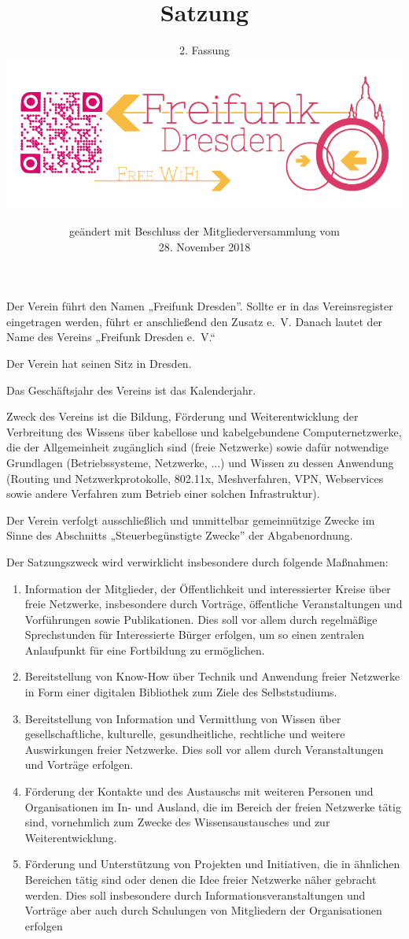 \documentclass[parskip]{scrartcl}
\title{Satzung}
\subtitle{2. Fassung\\\href{https://www.freifunk-dresden.de}{\includegraphics{assets/Logo_Freifunk_Dresden}}}
\date{geändert mit Beschluss der Mitgliederversammlung vom\\28. November 2018}
\begin{document}
\maketitle
\tableofcontents\newpage

\begin{contract} %

Der Verein führt den Namen „Freifunk Dresden”. Sollte er in das Vereinsregister eingetragen werden, führt er anschließend den Zusatz e.~V. Danach lautet der Name des Vereins „Freifunk Dresden e.~V.“

Der Verein hat seinen Sitz in Dresden.

Das Geschäftsjahr des Vereins ist das Kalenderjahr.


Zweck des Vereins ist die Bildung, Förderung und Weiterentwicklung der Verbreitung des Wissens über kabellose und kabelgebundene Computernetzwerke, die der Allgemeinheit zugänglich sind (freie Netzwerke) sowie dafür notwendige Grundlagen (Betriebssysteme, Netzwerke, ...) und Wissen zu dessen Anwendung (Routing und Netzwerkprotokolle, 802.11x, Meshverfahren, VPN, Webservices sowie andere Verfahren zum Betrieb einer solchen Infrastruktur).

Der Verein verfolgt ausschließlich und unmittelbar gemeinnützige Zwecke im Sinne des Abschnitts „Steuerbegünstigte Zwecke” der Abgabenordnung.

Der Satzungszweck wird verwirklicht insbesondere durch folgende Maßnahmen:

\begin{enumerate}
\item Information der Mitglieder, der Öffentlichkeit und interessierter Kreise über freie Netzwerke, insbesondere durch Vorträge, öffentliche Veranstaltungen und Vorführungen sowie Publikationen. Dies soll vor allem durch regelmäßige Sprechstunden für Interessierte Bürger erfolgen, um so einen zentralen Anlaufpunkt für eine Fortbildung zu ermöglichen.
\item Bereitstellung von Know-How über Technik und Anwendung freier Netzwerke in Form einer digitalen Bibliothek zum Ziele des Selbststudiums.
\item Bereitstellung von Information und Vermittlung von Wissen über gesellschaftliche, kulturelle, gesundheitliche, rechtliche und weitere Auswirkungen freier Netzwerke. Dies soll vor allem durch Veranstaltungen und Vorträge erfolgen.
\item Förderung der Kontakte und des Austauschs mit weiteren Personen und Organisationen im In- und Ausland, die im Bereich der freien Netzwerke tätig sind, vornehmlich zum Zwecke des Wissensaustausches und zur Weiterentwicklung.
\item Förderung und Unterstützung von Projekten und Initiativen, die in ähnlichen Bereichen tätig sind oder denen die Idee freier Netzwerke näher gebracht werden. Dies soll insbesondere durch Informationsveranstaltungen und Vorträge aber auch durch Schulungen von Mitgliedern der Organisationen erfolgen
\end{enumerate}


\end{contract}
\end{document}
